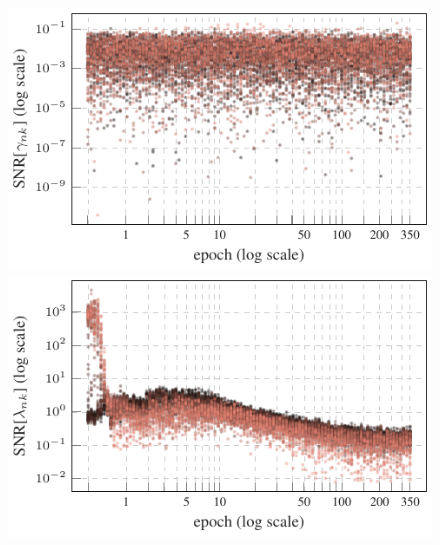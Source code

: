 \begin{figure}[p]
\textbf{\cifarhun \allcnnc \sgd}\\[1mm]
\begin{minipage}{0.50\textwidth}
\centering
\includegraphics[width=\linewidth]{fig/exp13_plots/gammas_lambdas/cifar100_allcnnc_sgd_gammas.pdf}
\end{minipage}\hfill
\begin{minipage}{0.50\textwidth}
\centering
\includegraphics[width=\linewidth]{fig/exp13_plots/gammas_lambdas/cifar100_allcnnc_sgd_lambdas.pdf}
\end{minipage}

\vspace{3mm}


\end{figure}
